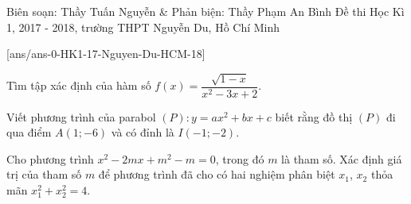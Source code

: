 \begin{name}
{Biên soạn: Thầy Tuấn Nguyễn \& Phản biện: Thầy Phạm An Bình}
{Đề thi Học Kì 1, 2017 - 2018, trường THPT Nguyễn Du, Hồ Chí Minh}
\end{name}
\setcounter{ex}{0}\setcounter{bt}{0}
[ans/ans-0-HK1-17-Nguyen-Du-HCM-18]
\begin{bt}%
Tìm tập xác định của hàm số  $f(x) = \dfrac{\sqrt{1 - x}}{x^2 - 3x + 2}$.
\end{bt}

\begin{bt}%
Viết phương trình  của parabol  $(P) \colon y = ax^2 + bx + c$  biết rằng đồ thị  $(P)$  đi qua điểm  $A(1; - 6)$  và có đỉnh là  $I(- 1; - 2)$.
\end{bt}

\begin{bt}%
Cho phương trình  $x^2 - 2mx + m^2 - m = 0$, trong đó $m$ là tham số.  Xác định giá trị của tham số $m$ để phương trình đã cho có hai nghiệm phân biệt  $x_1$, $x_2$  thỏa mãn  $x_1^2 + x_2^2 = 4$.
\end{bt}

